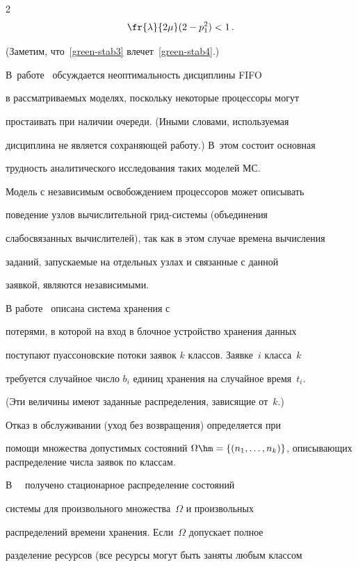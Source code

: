 \begin{multicols}{2}
\begin{equation}
 \fr{\lambda}{2\mu}(2-p_{1}^{2})<1\,.

\end{equation}

(Заметим, что~\eqref{green-stab3} влечет~\eqref{green-stab4}.) 

В~работе~\cite{green80-1} обсуждается неоптимальность  дисциплины FIFO

в рассматриваемых моделях, поскольку  некоторые процессоры могут

простаивать при наличии очереди. (Иными словами, используемая

дисциплина не является сохраняющей работу.)  В~этом состоит основная

трудность аналитического исследования таких моделей МС.



Модель с независимым освобождением процессоров может описывать

поведение узлов вычислительной грид-сис\-те\-мы (объединения

слабосвязанных вычислителей), так как в этом случае времена вычисления

заданий, запускаемые на отдельных узлах и связанные с данной

заявкой, являются  независимыми.



В работе~\cite{kaufman81} описана система хранения с

потерями, в которой на вход в блочное устройство хранения данных

поступают пуассоновские потоки заявок $k$ классов. Заявке~$i$ класса~$k$ 

требуется случайное чис\-ло $b_i$ единиц хранения на случайное время~$t_i$. 

(Эти величины имеют  заданные распределения, зависящие от~$k$.) 

Отказ в обслуживании (уход без возвращения) определяется при

помощи множества допустимых состояний $\Omega\hm=\{(n_{1},\ldots,

n_{k})\}$, описывающих распределение  числа заявок по классам. 

В~~\cite{kaufman81}  получено стационарное распределение состояний

сис\-те\-мы для произвольного множества~$\Omega$ и произвольных

распределений  времени хранения. Если~$\Omega$ допускает полное

разделение ресурсов (все ресурсы могут быть заняты любым классом


\end{multicols}
